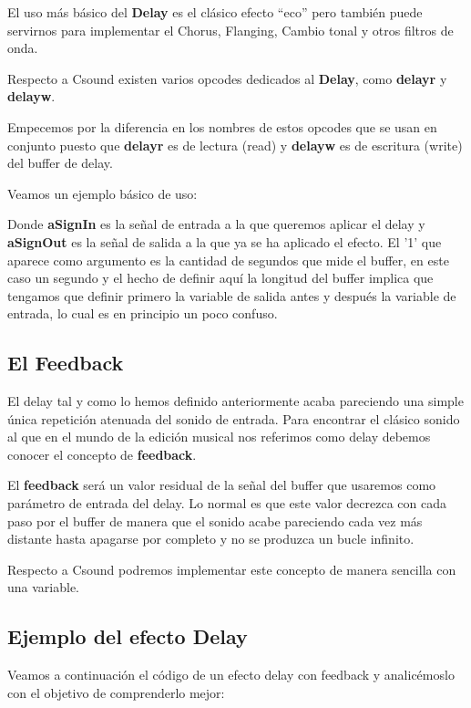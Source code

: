 El uso más básico del \textbf{Delay} es el clásico efecto ``eco'' pero también puede servirnos para implementar el Chorus, Flanging, Cambio tonal y otros filtros de onda.

Respecto a Csound existen varios opcodes dedicados al \textbf{Delay}, como \textbf{delayr} y \textbf{delayw}.

Empecemos por la diferencia en los nombres de estos opcodes que se usan en conjunto puesto que \textbf{delayr} es de lectura (read) y \textbf{delayw} es de escritura (write) del buffer de delay. 

Veamos un ejemplo básico de uso:


Donde \textbf{aSignIn} es la señal de entrada a la que queremos aplicar el delay y \textbf{aSignOut} es la señal de salida a la que ya se ha aplicado el efecto.
El '1' que aparece como argumento es la cantidad de segundos que mide el buffer, en este caso un segundo y el hecho de definir aquí la longitud del buffer implica que tengamos que definir primero la variable de salida antes y después la variable de entrada, lo cual es en principio un poco confuso.

\subsection{El Feedback}

El delay tal y como lo hemos definido anteriormente acaba pareciendo una simple única repetición atenuada del sonido de entrada. Para encontrar el clásico sonido al que en el mundo de la edición musical nos referimos como delay debemos conocer el concepto de \textbf{feedback}.

El \textbf{feedback} será un valor residual de la señal del buffer que usaremos como parámetro de entrada del delay. Lo normal es que este valor decrezca con cada paso por el buffer de manera que el sonido acabe pareciendo cada vez más distante hasta apagarse por completo y no se produzca un bucle infinito.

Respecto a Csound podremos implementar este concepto de manera sencilla con una variable.

\subsection{Ejemplo del efecto Delay}

Veamos a continuación el código de un efecto delay con feedback y analicémoslo con el objetivo de comprenderlo mejor:

